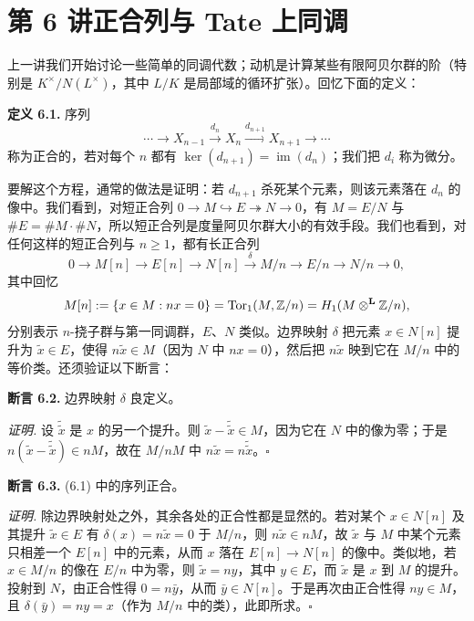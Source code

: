 \section*{第 6 讲\quad 正合列与 Tate 上同调}

上一讲我们开始讨论一些简单的同调代数；动机是计算某些有限阿贝尔群的阶（特别是 $K^\times/N(L^\times)$，其中 $L/K$ 是局部域的循环扩张）。回忆下面的定义：

\textbf{定义 6.1.} 序列
\[
\cdots\to X_{n-1}\xrightarrow{d_n}X_n\xrightarrow{d_{n+1}}X_{n+1}\to\cdots
\]
称为正合的，若对每个 $n$ 都有 $\ker(d_{n+1})=\operatorname{im}(d_n)$；我们把 $d_i$ 称为微分。

要解这个方程，通常的做法是证明：若 $d_{n+1}$ 杀死某个元素，则该元素落在 $d_n$ 的像中。我们看到，对短正合列 $0\to M\hookrightarrow E\twoheadrightarrow N\to 0$，有 $M=E/N$ 与 $\#E=\#M\cdot\#N$，所以短正合列是度量阿贝尔群大小的有效手段。我们也看到，对任何这样的短正合列与 $n\ge1$，都有长正合列
\begin{equation}\tag{6.1}
0\to M[n]\to E[n]\to N[n]\xrightarrow{\ \delta\ }M/n\to E/n\to N/n\to 0,
\end{equation}
其中回忆
\[
M[n]:=\{x\in M:nx=0\}=\operatorname{Tor}_1(M,\mathbb{Z}/n)=H_1(M\otimes^{\mathbf{L}}\mathbb{Z}/n),
\]
分别表示 $n$-挠子群与第一同调群，$E$、$N$ 类似。边界映射 $\delta$ 把元素 $x\in N[n]$ 提升为 $\tilde x\in E$，使得 $n\tilde x\in M$（因为 $N$ 中 $nx=0$），然后把 $n\tilde x$ 映到它在 $M/n$ 中的等价类。还须验证以下断言：

\textbf{断言 6.2.} 边界映射 $\delta$ 良定义。

\textit{证明.} 设 $\tilde{\tilde x}$ 是 $x$ 的另一个提升。则 $\tilde x-\tilde{\tilde x}\in M$，因为它在 $N$ 中的像为零；于是 $n(\tilde x-\tilde{\tilde x})\in nM$，故在 $M/nM$ 中 $n\tilde x=n\tilde{\tilde x}$。\hfill$\square$

\textbf{断言 6.3.} (6.1) 中的序列正合。

\textit{证明.} 除边界映射处之外，其余各处的正合性都是显然的。若对某个 $x\in N[n]$ 及其提升 $\tilde x\in E$ 有 $\delta(x)=n\tilde x=0$ 于 $M/n$，则 $n\tilde x\in nM$，故 $\tilde x$ 与 $M$ 中某个元素只相差一个 $E[n]$ 中的元素，从而 $x$ 落在 $E[n]\to N[n]$ 的像中。类似地，若 $x\in M/n$ 的像在 $E/n$ 中为零，则 $\tilde x=ny$，其中 $y\in E$，而 $\tilde x$ 是 $x$ 到 $M$ 的提升。投射到 $N$，由正合性得 $0=n\bar y$，从而 $\bar y\in N[n]$。于是再次由正合性得 $ny\in M$，且 $\delta(\bar y)=ny=x$（作为 $M/n$ 中的类），此即所求。\hfill$\square$

